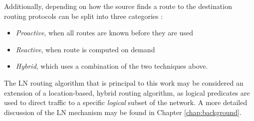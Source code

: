 Additionally, depending on how the source finds a route to the destination
routing protocols can be split into three categories \cite{routing:2004}:
\begin{itemize}
	\item \emph{Proactive}, when all routes are known before they are used
	\item \emph{Reactive}, when route is computed on demand 
	\item \emph{Hybrid}, which uses a combination of the two techniques above.
\end{itemize}


The LN routing algorithm that is principal to this work may be considered an
extension of a location-based, hybrid routing algorithm, as logical predicates
are used to direct traffic to a specific \emph{logical} subset of the network. A more
detailed discussion of the LN mechanism may be found in
Chapter \ref{chap:background}.


